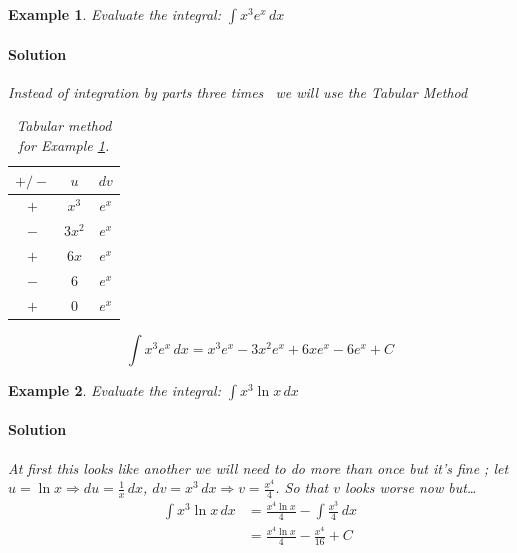 \documentclass[letterpaper, 11pt, openany]{book}
\theoremstyle{mytheoremstyle}
\theoremstyle{myexamplestyle}
\newtheorem{example}{Example}[section]
\newenvironment{solution}{\paragraph{\sffamily \smaller \fontseries{b}\selectfont Solution}}{\hfill\faSquare}
\begin{document}
\begin{example}\label{e:ibpexp3x}
Evaluate the integral: $\displaystyle \int x^{3} e^{x}\, dx$

\begin{solution}
    Instead of integration by parts three times \faMeh \ we will use the Tabular Method \faSmile
    
    \begin{table}[htbp]
    	\centering
    	\caption{Tabular method for Example \ref{e:ibpexp3x}.}
    	\begin{tabular}{ccc}
    		\hline
    		$+/-$ & $u$ & $dv$ \\ \hline
    		$+$ & $x^{3}$ & $e^{x}$ \\
    		$-$ & $3x^{2}$ & $e^{x}$ \\
    		$+$ & $6x$ & $e^{x}$ \\
    		$-$ & $6$ & $e^{x}$ \\
    		$+$ & $0$ & $e^{x}$ \\ \hline
    	\end{tabular}
    \end{table}
    \[\int x^{3} e^{x}\, dx = x^{3}e^{x} - 3x^{2} e^{x} + 6x e^{x} - 6e^{x} + C\]
\end{solution}
\end{example}

\begin{example}\label{e:ibp-x3lnx}
    Evaluate the integral: $\displaystyle \int x^{3} \ln x \, dx$
    \begin{solution}
        At first this looks like another we will need to do more than once but it's fine \faSmile; let $u = \ln x \Rightarrow du = \frac{1}{x}\, dx$, $dv = x^{3} \, dx \Rightarrow v = \frac{x^{4}}{4}$. So that $v$ looks worse now but\dots
        \begin{align*}
            \int x^{3} \ln x \, dx  &= \frac{x^{4}\ln x}{4} - \int \frac{x^{3}}{4} \, dx \\
                                    &= \frac{x^{4}\ln x}{4} - \frac{x^{4}}{16} + C
        \end{align*}
    \end{solution}
\end{example}
\end{document}
